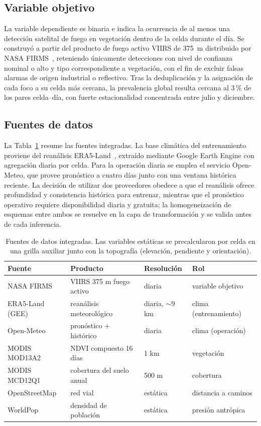 \documentclass[11pt,a4paper]{article}
\begin{document}
\subsection{Variable objetivo}

La variable dependiente es binaria e indica la ocurrencia de al menos una
detección satelital de fuego en vegetación dentro de la celda durante el
día. Se construyó a partir del producto de fuego activo VIIRS de 375~m
distribuido por NASA FIRMS~\cite{firms,schroeder2014}, reteniendo únicamente
detecciones con nivel de confianza nominal o alto y tipo correspondiente a
vegetación, con el fin de excluir falsas alarmas de origen industrial o
reflectivo. Tras la deduplicación y la asignación de cada foco a su celda
más cercana, la prevalencia global resulta cercana al 3\,\% de los pares
celda--día, con fuerte estacionalidad concentrada entre julio y diciembre.

\subsection{Fuentes de datos}

La Tabla~\ref{tab:fuentes} resume las fuentes integradas. La base climática
del entrenamiento proviene del reanálisis ERA5-Land~\cite{era5land},
extraído mediante Google Earth Engine con agregación diaria por celda. Para
la operación diaria se emplea el servicio Open-Meteo, que provee pronóstico
a cuatro días junto con una ventana histórica reciente. La decisión de
utilizar dos proveedores obedece a que el reanálisis ofrece profundidad y
consistencia histórica para entrenar, mientras que el pronóstico operativo
requiere disponibilidad diaria y gratuita; la homogeneización de esquemas
entre ambos se resuelve en la capa de transformación y se valida antes de
cada inferencia.

\begin{table}[H]
\centering\small
\begin{tabular}{@{}llll@{}}
\toprule
\textbf{Fuente} & \textbf{Producto} & \textbf{Resolución} & \textbf{Rol} \\
\midrule
NASA FIRMS & VIIRS 375 m fuego activo & diaria & variable objetivo \\
ERA5-Land (GEE) & reanálisis meteorológico & diaria, $\sim$9 km & clima (entrenamiento) \\
Open-Meteo & pronóstico + histórico & diaria & clima (operación) \\
MODIS MOD13A2 & NDVI compuesto 16 días & 1 km & vegetación \\
MODIS MCD12Q1 & cobertura del suelo anual & 500 m & cobertura \\
OpenStreetMap & red vial & estática & distancia a caminos \\
WorldPop & densidad de población & estática & presión antrópica \\
\bottomrule
\end{tabular}
\caption{Fuentes de datos integradas. Las variables estáticas se
precalcularon por celda en una grilla auxiliar junto con la topografía
(elevación, pendiente y orientación).}
\label{tab:fuentes}
\end{table}
\end{document}
